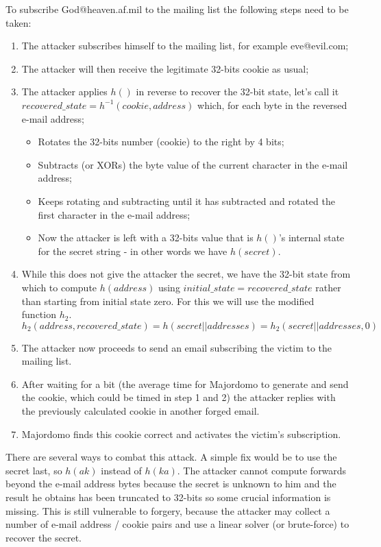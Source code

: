 \documentclass{article}
\begin{document}
To subscribe God@heaven.af.mil to the mailing list the following steps need to be taken:
\begin{enumerate}
	\item The attacker subscribes himself to the mailing list, for example eve@evil.com;
	\item The attacker will then receive the legitimate 32-bits cookie as usual;
	\item The attacker applies $h()$ in reverse to recover the 32-bit state, let's call it $recovered\_state = h^{-1}(cookie, address)$ which, for each byte in the reversed e-mail address;
		\begin{itemize}
		\item Rotates the 32-bits number (cookie) to the right by 4 bits;
		\item Subtracts (or XORs) the byte value of the current character in the e-mail address;
		\item Keeps rotating and subtracting until it has subtracted and rotated the first character in the e-mail address;
		\item Now the attacker is left with a 32-bits value that is $h()$'s internal state for the secret string - in other words we have $h(secret)$.
		\end{itemize}
	\item While this does not give the attacker the secret, we have the 32-bit state from which to compute $h(address)$ using $initial\_state = recovered\_state$ rather than starting from initial state zero.
	For this we will use the modified function $h_2$.
\[ h_2(address, recovered\_state) = h(secret||addresses) = h_2(secret||addresses,0) \]
	\item The attacker now proceeds to send an email subscribing the victim to the mailing list.
	\item After waiting for a bit (the average time for Majordomo to generate and send the cookie, which could be timed in step 1 and 2) the attacker replies with the previously calculated cookie in another forged email.
	\item Majordomo finds this cookie correct and activates the victim's subscription.
\end{enumerate}
	
There are several ways to combat this attack.
A simple fix would be to use the secret last, so $h(ak)$ instead of $h(ka)$.
The attacker cannot compute forwards beyond the e-mail address bytes because the secret is unknown to him and the result he obtains has been truncated to 32-bits so some crucial information is missing.
This is still vulnerable to forgery, because the attacker may collect a number of e-mail address / cookie pairs and use a linear solver (or brute-force) to recover the secret.
\end{document}
